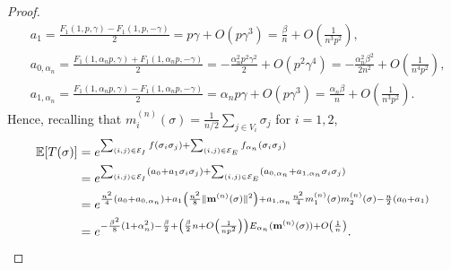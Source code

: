 \documentclass[11pt,oneside]{amsart}
\numberwithin{equation}{section}  %
\theoremstyle{plain}
\theoremstyle{remark}
\def \E {{\mathbb E}}
\def \cE {\mathcal{E}}
\def \s {{\sigma}}
\def \bm {{\bf m}}
\begin{document}
\begin{proof}
\begin{align*}
& a_1 = \frac{F_1(1, p, \gamma) - F_1(1, p, -\gamma)}{2} = p \gamma + O(p \gamma^3) = \frac{\beta}{n} + O\left(\frac{1}{n^3p^2} \right), \\
& a_{0, \alpha_n} = \frac{F_1(1, \alpha_n p, \gamma) + F_1(1, \alpha_n p, -\gamma)}{2} = -\frac{\alpha_n^2 p^2 \gamma^2}{2}  + O(p^2 \gamma^4) = - \frac{\alpha_n ^2 \beta^2}{2n^2} + O\left(\frac{1}{n^4p^2} \right), \\
& a_{1, \alpha_n} = \frac{F_1(1, \alpha_n p, \gamma) - F_1(1, \alpha_n p, -\gamma)}{2} = \alpha_n p \gamma + O(p \gamma^3) = \frac{\alpha_n \beta}{n} + O\left(\frac{1}{n^3p^2} \right).
\end{align*}
Hence, recalling that $m_i^{(n)}(\s)=\frac{1}{n/2} \sum_{j \in V_i} \sigma_j$ for $i=1,2$,
\begin{equation*}
\begin{split}
\E[T(\sigma)] & = e^{ \sum_{(i,j) \in \cE_I} f(\sigma_i \sigma_j) + \sum_{(i,j) \in \cE_E} f_{\alpha_n}(\sigma_i \sigma_j) } \\
& = e^{ \sum_{(i,j) \in \cE_I} (a_0 + a_1 \sigma_i \sigma_j) + \sum_{(i,j) \in \cE_E} (a_{0, \alpha_n} + a_{1, \alpha_n} \sigma_i \sigma_j)} \\
& = e^{\frac{n^2}{4}\left( a_0 + a_{0,\alpha_n}\right) + a_1 \left( \frac{n^2}{8} \|\bm^{(n)}(\s)\|^2 \right) + a_{1,\alpha_n} \frac{n^2}{4} m_1^{(n)}(\s) m_2^{(n)}(\s) -\frac{n}{2} (a_0+a_1)
} \\
& = e^{- \frac{\beta^2}{8} (1+\alpha_n^2)-\frac{\beta}{2} + \left(\frac{\beta}{2}n+O\left(\frac{1}{np^2}\right)\right) E_{\alpha_n}(\bm^{(n)}(\s)) +O \left(\frac{1}{n} \right )}.
\end{split}
\end{equation*}


\end{proof}
\end{document}

